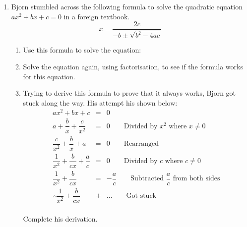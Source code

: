 \begin{enumerate}
\item{Bjorn stumbled across the following formula to solve
the quadratic equation $ax^2+bx+c=0$ in a foreign textbook.
$$x = \dfrac{2c}{-b \pm \sqrt{b^2 - 4ac}}$$}
\begin{enumerate}
\item{Use this formula to solve the equation:
}
\item{Solve the equation again, using factorisation, to see if the formula works for this equation.}
\item{Trying to derive this formula to prove that it always works, Bjorn got stuck along the way. His attempt his shown
below:}
\begin{eqnarray*}
ax^2 + bx + c &=& 0 \\
a + \dfrac{b}{x} + \dfrac{c}{x^2} &=& 0 \qquad \mbox{Divided by $x^2$ where $x \ne 0$} \\
\dfrac{c}{x^2} + \dfrac{b}{x} + a &=& 0 \qquad \mbox{Rearranged}\\
\dfrac{1}{x^2} + \dfrac{b}{cx} + \dfrac{a}{c} &=& 0 \qquad \mbox{Divided by $c$ where $c \ne 0$}\\
\dfrac{1}{x^2} + \dfrac{b}{cx} &=& -\dfrac{a}{c} \qquad \mbox{Subtracted $\dfrac{a}{c}$ from both sides} \\
\therefore \dfrac{1}{x^2} + \dfrac{b}{cx} &+& \ldots \qquad \mbox{Got stuck}
\end{eqnarray*}
\\
Complete his derivation.
\end{enumerate}

\end{enumerate}





